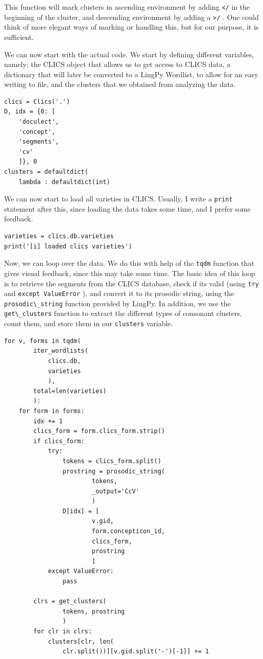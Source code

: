 \documentclass[
  english,
  a4paper,
  oneside,tablecaptionabove
]{scrbook}
\newcommand{\passthrough}[1]{#1}
\begin{document}
This function will mark clusters in ascending environment by adding
\passthrough{\lstinline!</!} in the beginning of the cluster, and
descending environment by adding a \passthrough{\lstinline!>/!} . One
could think of more elegant ways of marking or handling this, but for
our purpose, it is sufficient.

We can now start with the actual code. We start by defining different
variables, namely: the CLICS object that allows us to get access to
CLICS data, a dictionary that will later be converted to a LingPy
Wordlist, to allow for an easy writing to file, and the clusters that we
obtained from analyzing the data.

\begin{lstlisting}
clics = Clics('.') 
D, idx = {0: [ 
    'doculect', 
    'concept', 
    'segments', 
    'cv' 
    ]}, 0 
clusters = defaultdict( 
    lambda : defaultdict(int)
\end{lstlisting}

We can now start to load all varieties in CLICS. Usually, I write a
\passthrough{\lstinline!print!} statement after this, since loading the
data takes some time, and I prefer some feedback.

\begin{lstlisting}
varieties = clics.db.varieties
print('[i] loaded clics varieties')
\end{lstlisting}

Now, we can loop over the data. We do this with help of the
\passthrough{\lstinline!tqdm!} function that gives visual feedback,
since this may take some time. The basic idea of this loop is to
retrieve the segments from the CLICS database, check if its valid (using
\passthrough{\lstinline!try!} and
\passthrough{\lstinline!except ValueError!} ), and convert it to its
prosodic string, using the \passthrough{\lstinline!prosodic\_string!}
function provided by LingPy. In addition, we use the
\passthrough{\lstinline!get\_clusters!} function to extract the
different types of consonant clusters, count them, and store them in our
\passthrough{\lstinline!clusters!} variable.

\begin{lstlisting}
for v, forms in tqdm(
        iter_wordlists(
            clics.db, 
            varieties
            ), 
        total=len(varieties)
        ):
    for form in forms:
        idx += 1
        clics_form = form.clics_form.strip()
        if clics_form:
            try:
                tokens = clics_form.split()
                prostring = prosodic_string(
                        tokens,
                        _output='CcV'
                        )
                D[idx] = [
                        v.gid, 
                        form.concepticon_id, 
                        clics_form,
                        prostring
                        ]
            except ValueError:
                pass

        clrs = get_clusters(
                tokens, prostring
                )
        for clr in clrs:
            clusters[clr, len(
                clr.split())][v.gid.split('-')[-1]] += 1
\end{lstlisting}
\end{document}
